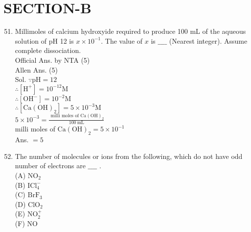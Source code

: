 \documentclass[10pt]{article}
\begin{document}
\section*{SECTION-B}
\begin{enumerate}
  \setcounter{enumi}{50}
  \item Millimoles of calcium hydroxyide required to produce 100 mL of the aqueous solution of pH 12 is \(x \times 10^{-1}\). The value of \(x\) is \(\_\_\_\_\) (Nearest integer). Assume complete dissociation.\\
Official Ans. by NTA (5)\\
Allen Ans. (5)\\
Sol. \(\because \mathrm{pH}=12\)\\
\(\therefore\left[\mathrm{H}^{+}\right]=10^{-12} \mathrm{M}\)\\
\(\therefore\left[\mathrm{OH}^{-}\right]=10^{-2} \mathrm{M}\)\\
\(\therefore\left[\mathrm{Ca}(\mathrm{OH})_{2}\right]=5 \times 10^{-3} \mathrm{M}\)\\
\(5 \times 10^{-3}=\frac{\text { milli moles of } \mathrm{Ca}(\mathrm{OH})_{2}}{100 \mathrm{~mL}}\)\\
milli moles of \(\mathrm{Ca}(\mathrm{OH})_{2}=5 \times 10^{-1}\)\\
Ans. \(=5\)
  \item The number of molecules or ions from the following, which do not have odd number of electrons are \(\_\_\_\_\) .\\
(A) \(\mathrm{NO}_{2}\)\\
(B) \(\mathrm{ICl}_{4}^{-}\)\\
(C) \(\mathrm{BrF}_{3}\)\\
(D) \(\mathrm{ClO}_{2}\)\\
(E) \(\mathrm{NO}_{2}^{+}\)\\
(F) NO
\end{enumerate}
\end{document}
